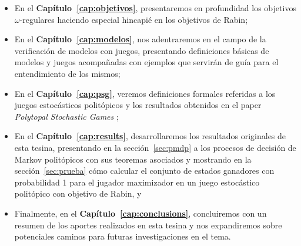 \begin{itemize}
	\item En el \textbf{Capítulo~\ref{cap:objetivos}}, presentaremos en profundidad los
	      objetivos $\omega$-regulares haciendo especial hincapié en los objetivos de
	      Rabin;

	\item En el \textbf{Capítulo~\ref{cap:modelos}}, nos adentraremos en el campo de la
	      verificación de modelos con juegos, presentando definiciones básicas de modelos
	      y juegos acompañadas con ejemplos que servirán de guía para el entendimiento de
	      los mismos;

	\item En el \textbf{Capítulo~\ref{cap:psg}}, veremos definiciones formales referidas
	      a los juegos estocásticos politópicos y los resultados obtenidos en el paper
	      \textit{Polytopal Stochastic Games} \cite{Polytopal};

	\item En el \textbf{Capítulo~\ref{cap:results}}, desarrollaremos los resultados
	      originales de esta tesina, presentando en la sección~\ref{sec:pmdp} a los
	      procesos de decisión de Markov politópicos con sus teoremas asociados y
	      mostrando en la sección~\ref{sec:prueba} cómo calcular el conjunto de estados
	      ganadores con probabilidad 1 para el jugador maximizador en un juego
	      estocástico politópico con objetivo de Rabin, y

	\item Finalmente, en el \textbf{Capítulo~\ref{cap:conclusions}}, concluiremos con un
	      resumen de los aportes realizados en esta tesina y nos expandiremos sobre
	      potenciales caminos para futuras investigaciones en el tema.

\end{itemize}

